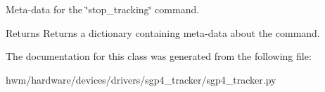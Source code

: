 Meta-\/data for the \char`\"{}stop\-\_\-tracking\char`\"{} command. 

\begin{DoxyReturn}{Returns}
Returns a dictionary containing meta-\/data about the command. 
\end{DoxyReturn}


The documentation for this class was generated from the following file\-:\begin{DoxyCompactItemize}
\item 
hwm/hardware/devices/drivers/sgp4\-\_\-tracker/sgp4\-\_\-tracker.\-py\end{DoxyCompactItemize}
